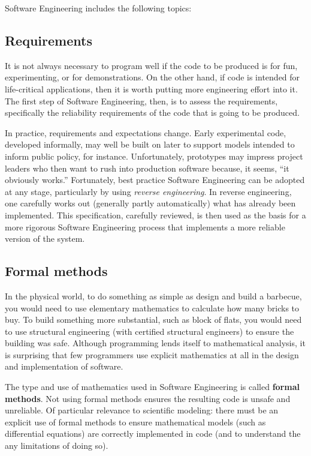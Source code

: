 \documentclass[10pt,a4paper]{article}
\begin{document}
Software Engineering includes the following topics:

\subsection{Requirements}
It is not always necessary to program well if the code to be produced is for fun, experimenting, or for demonstrations. On the other hand, if code is intended for life-critical applications, then it is worth putting more engineering effort into it. The first step of Software Engineering, then, is to assess the requirements, specifically the reliability requirements of the code that is going to be produced. 

In practice, requirements and expectations change. Early experimental code, developed informally, may well be built on later to support models intended to inform public policy, for instance. Unfortunately, prototypes may impress project leaders who then want to rush into production software because, it seems, ``it obviously works.'' Fortunately, best practice Software Engineering can be adopted at any stage, particularly by using \emph{reverse engineering}. In reverse engineering, one carefully works out (generally partly automatically) what has already been implemented. This specification, carefully reviewed, is then used as the basis for a more rigorous Software Engineering process that implements a more reliable version of the system.

\subsection{Formal methods}

{In the physical world, to do something as simple as design and build a barbecue, you would need to use elementary mathematics to calculate how many bricks to buy. To build something more substantial, such as block of flats, you would need to use structural engineering (with certified structural engineers) to ensure the building was safe. Although programming lends itself to mathematical analysis, it is surprising that few programmers use explicit mathematics at all in the design and implementation of software.} 

{The type and use of mathematics used in Software Engineering is called \textbf{formal methods}. Not using formal methods ensures the resulting code is unsafe and unreliable. Of particular relevance to scientific modeling: there must be an explicit use of formal methods to ensure mathematical models (such as differential equations) are correctly implemented in code (and to understand the any limitations of doing so).}
\end{document}
